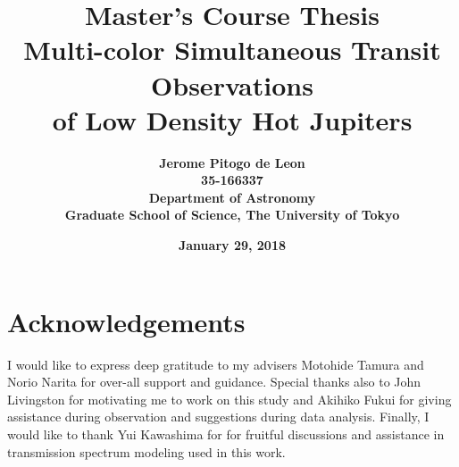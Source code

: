 \documentclass[11pt,a4paper,twoside]{report}
\title{
  \Large{\bf Master's Course Thesis}\\[1.5cm]
  \LARGE{\bf Multi-color Simultaneous Transit Observations \\
of Low Density Hot Jupiters}\\[2cm]
}
\date{\Large{\bf January 29, 2018}}
\author{
  \Large{\bf Jerome Pitogo de Leon}\\
  \Large{\bf 35-166337}\\
  \Large{\bf Department of Astronomy}\\
  \Large{\bf Graduate School of Science,
  The University of Tokyo}\\
}
\begin{document}
\maketitle




\tableofcontents
\listoffigures
\listoftables








\chapter{Acknowledgements}
I would like to express deep gratitude to my advisers Motohide Tamura and Norio Narita for over-all support and guidance. Special thanks also to John Livingston for motivating me to work on this study and Akihiko Fukui for giving assistance during observation and suggestions during data analysis. Finally, I would like to thank Yui Kawashima for for fruitful discussions and assistance in transmission spectrum modeling used in this work. %





\end{document}
